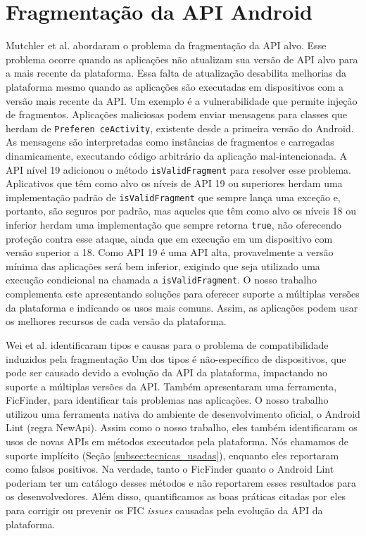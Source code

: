 \section{Fragmentação da API Android}

Mutchler et al. \cite{Mutchler2016} abordaram o problema da fragmentação da API alvo.
Esse problema ocorre quando as aplicações não atualizam sua versão de API alvo para a
mais recente da plataforma. Essa falta de atualização desabilita melhorias da plataforma
mesmo quando as aplicações são executadas em dispositivos com a versão mais recente da API.
Um exemplo é a vulnerabilidade que permite injeção de fragmentos. Aplicações maliciosas
podem enviar mensagens para classes que herdam de
\texttt{Preferen ceActivity}, %
existente
desde a primeira versão do Android. As mensagens são interpretadas como instâncias de
fragmentos e carregadas dinamicamente, executando código arbitrário da aplicação
mal-intencionada. A API nível 19 adicionou o método \texttt{isValidFragment} para resolver
esse problema. Aplicativos que têm como alvo os níveis de API 19 ou superiores herdam uma implementação padrão de \texttt{isValidFragment} que sempre lança uma exceção e, portanto,
são seguros por padrão, mas aqueles que têm como alvo os níveis 18 ou inferior herdam uma implementação que sempre retorna \texttt{true}, não oferecendo proteção contra esse ataque,
ainda que em execução em um dispositivo com versão superior a 18.  Como API 19 é uma API
alta, provavelmente a versão mínima das aplicações  será bem inferior, exigindo que seja
utilizado uma execução condicional na chamada a \texttt{isValidFragment}. O nosso trabalho
complementa este apresentando soluções para oferecer suporte a múltiplas versões da plataforma
e indicando os usos mais comuns. Assim, as aplicações podem usar os melhores recursos de cada
versão da plataforma. 

Wei et al. \cite{Wei2016} identificaram tipos e causas para o problema de compatibilidade
induzidos pela fragmentação  Um
dos tipos é não-específico de dispositivos, que pode ser causado devido a evolução da API da
plataforma, impactando no suporte a múltiplas versões da API. Também apresentaram uma ferramenta, 
FicFinder, para identificar tais problemas nas aplicações. O nosso trabalho utilizou uma ferramenta 
nativa do ambiente de desenvolvimento oficial, o Android Lint (regra NewApi). Assim como o nosso 
trabalho, eles também identificaram os usos de novas APIs em métodos executados pela plataforma. Nós 
chamamos de suporte implícito (Seção \ref{subsec:tecnicas_usadas}), enquanto eles reportaram como 
falsos positivos. Na verdade, tanto o FicFinder quanto o Android Lint poderiam ter um catálogo desses 
métodos e não reportarem esses resultados para os desenvolvedores. Além disso, quantificamos as boas 
práticas citadas por eles para corrigir ou prevenir os FIC \textit{issues} causadas pela evolução da API da plataforma.

